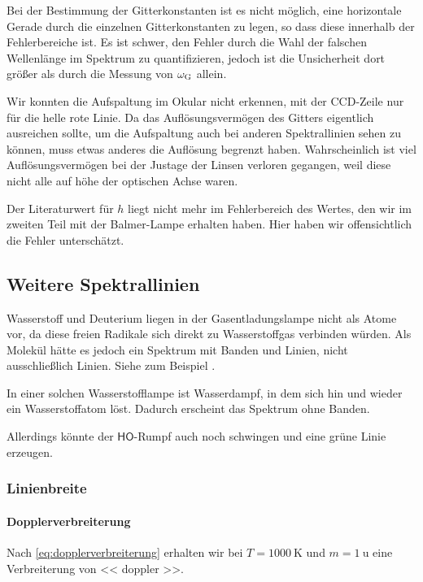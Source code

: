 Bei der Bestimmung der Gitterkonstanten ist es nicht möglich, eine horizontale
Gerade durch die einzelnen Gitterkonstanten zu legen, so dass diese innerhalb
der Fehlerbereiche ist. Es ist schwer, den Fehler durch die Wahl der falschen
Wellenlänge im Spektrum zu quantifizieren, jedoch ist die Unsicherheit dort
größer als durch die Messung von $\omega_\text G$ allein.

Wir konnten die Aufspaltung im Okular nicht erkennen, mit der CCD-Zeile nur für
die helle rote Linie. Da das Auflösungsvermögen des Gitters eigentlich
ausreichen sollte, um die Aufspaltung auch bei anderen Spektrallinien sehen zu
können, muss etwas anderes die Auflösung begrenzt haben. Wahrscheinlich ist
viel Auflösungsvermögen bei der Justage der Linsen verloren gegangen, weil
diese nicht alle auf höhe der optischen Achse waren.

Der Literaturwert für $h$ liegt nicht mehr im Fehlerbereich des Wertes, den wir
im zweiten Teil mit der Balmer-Lampe erhalten haben. Hier haben wir
offensichtlich die Fehler unterschätzt.

\subsection{Weitere Spektrallinien}

Wasserstoff und Deuterium liegen in der Gasentladungslampe nicht als Atome vor,
da diese freien Radikale sich direkt zu Wasserstoffgas verbinden würden. Als
Molekül hätte es jedoch ein Spektrum mit Banden und Linien, nicht
ausschließlich Linien. Siehe zum Beispiel
\cite[Abbildung~14.15]{meschede-gerthsen_24}.

In einer solchen Wasserstofflampe ist Wasserdampf, in dem sich hin und wieder
ein Wasserstoffatom löst. Dadurch erscheint das Spektrum ohne Banden.
\parencite[Abschnitt~2.1]{leybold/balmer_lampe}
\parencite{wikipedia/gas_discharge_lamp}

Allerdings könnte der $\mathrm{\mathsf{HO}}$-Rumpf auch noch schwingen und eine
grüne Linie erzeugen.

\subsubsection{Linienbreite}

\paragraph{Dopplerverbreiterung}

Nach \eqref{eq:dopplerverbreiterung} erhalten wir bei $T = \SI{1000}{\kelvin}$
und $m = \SI{1}{\atomicmassunit}$ eine Verbreiterung von \num{<< doppler >>}.

